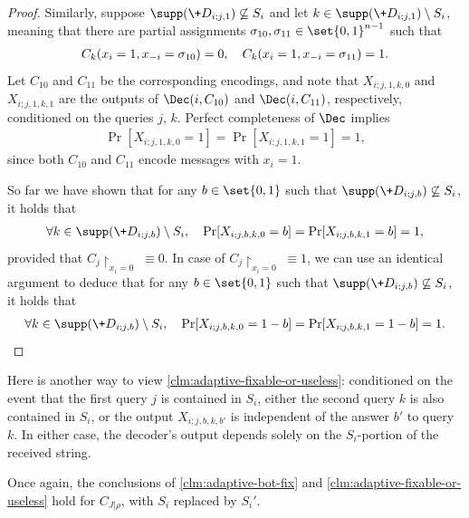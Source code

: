 \begin{proof}
Similarly, suppose $\supp(\+D_{i;j,1}) \not\subseteq S_i$ and let $k \in \supp(\+D_{i;j,1}) \setminus S_i$, meaning that there are partial assignments $\sigma_{10}, \sigma_{11} \in \set{0,1}^{n-1}$ such that
\begin{align*}
C_k(x_i=1, \*x_{-i}=\sigma_{10}) = 0, \quad C_k(x_i=1, \*x_{-i}=\sigma_{11}) = 1.
\end{align*}
Let $C_{10}$ and $C_{11}$ be the corresponding encodings, and note that $X_{i;j,1,k,0}$ and $X_{i;j,1,k,1}$ are the outputs of $\Dec(i,C_{10})$ and $\Dec(i,C_{11})$, respectively, conditioned on the queries $j$, $k$. Perfect completeness of $\Dec$ implies
\begin{align*}
\Pr[X_{i;j,1,k,0} = 1] = \Pr[X_{i;j,1,k,1} = 1] = 1,
\end{align*}
since both $C_{10}$ and $C_{11}$ encode messages with $x_i = 1$.

So far we have shown that for any $b \in \set{0,1}$ such that $\supp(\+D_{i;j,b}) \not\subseteq S_i$, it holds that
\begin{align*}
	\forall k \in \supp(\+D_{i;j,b})\setminus S_i, \quad \Pr[X_{i;j,b,k,0}=b] = \Pr[X_{i;j,b,k,1}=b] = 1,
\end{align*}
provided that $C_j \restriction_{x_i = 0} \;\equiv 0$. In case of $C_j \restriction_{x_i = 0} \;\equiv 1$, we can use an identical argument to deduce that for any $b \in \set{0,1}$ such that $\supp(\+D_{i;j,b}) \not\subseteq S_i$, it holds that
\begin{align*}
\forall k \in \supp(\+D_{i;j,b})\setminus S_i, \quad \Pr[X_{i;j,b,k,0}=1-b] = \Pr[X_{i;j,b,k,1}=1-b] = 1.
\end{align*}
\end{proof}

Here is another way to view \cref{clm:adaptive-fixable-or-useless}: conditioned on the event that the first query $j$ is contained in $S_i$, either the second query $k$ is also contained in $S_i$, or the output $X_{i;j,b,k,b'}$ is independent of the answer $b'$ to query $k$. In either case, the decoder's output depends solely on the $S_i$-portion of the received string.

Once again, the conclusions of \cref{clm:adaptive-bot-fix} and \cref{clm:adaptive-fixable-or-useless} hold for $C_{J|\rho}$, with $S_i$ replaced by $S_i'$.

